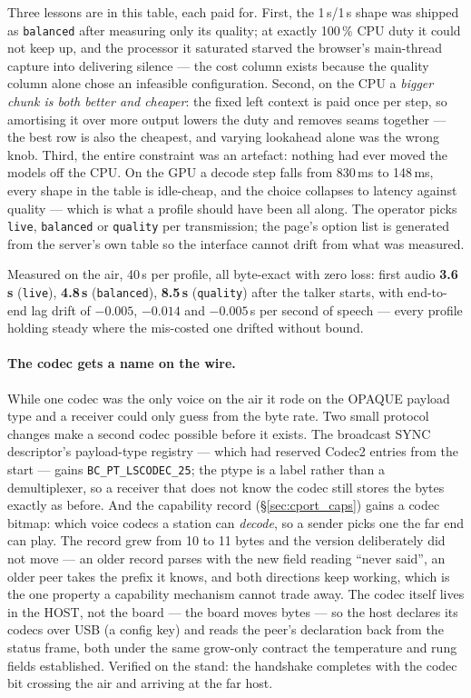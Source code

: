 Three lessons are in this table, each paid for.  First, the 1\,s/1\,s
shape was shipped as \texttt{balanced} after measuring only its
quality; at exactly 100\,\% CPU duty it could not keep up, and the
processor it saturated starved the browser's main-thread capture into
delivering silence --- the cost column exists because the quality
column alone chose an infeasible configuration.  Second, on the CPU a
\emph{bigger chunk is both better and cheaper}: the fixed left context
is paid once per step, so amortising it over more output lowers the
duty and removes seams together --- the best row is also the cheapest,
and varying lookahead alone was the wrong knob.  Third, the entire
constraint was an artefact: nothing had ever moved the models off the
CPU.  On the GPU a decode step falls from 830\,ms to 148\,ms, every
shape in the table is idle-cheap, and the choice collapses to latency
against quality --- which is what a profile should have been all
along.  The operator picks \texttt{live}, \texttt{balanced} or
\texttt{quality} per transmission; the page's option list is generated
from the server's own table so the interface cannot drift from what
was measured.

Measured on the air, 40\,s per profile, all byte-exact with zero loss:
first audio \textbf{3.6\,s} (\texttt{live}), \textbf{4.8\,s}
(\texttt{balanced}), \textbf{8.5\,s} (\texttt{quality}) after the
talker starts, with end-to-end lag drift of $-0.005$, $-0.014$ and
$-0.005$\,s per second of speech --- every profile holding steady where
the mis-costed one drifted without bound.

\paragraph{The codec gets a name on the wire.}
While one codec was the only voice on the air it rode on the OPAQUE
payload type and a receiver could only guess from the byte rate.  Two
small protocol changes make a second codec possible before it exists.
The broadcast SYNC descriptor's payload-type registry --- which had
reserved Codec2 entries from the start --- gains
\texttt{BC\_PT\_LSCODEC\_25}; the ptype is a label rather than a
demultiplexer, so a receiver that does not know the codec still stores
the bytes exactly as before.  And the capability record
(\S\ref{sec:cport_caps}) gains a codec bitmap: which voice codecs a
station can \emph{decode}, so a sender picks one the far end can play.
The record grew from 10 to 11 bytes and the version deliberately did
not move --- an older record parses with the new field reading
``never said'', an older peer takes the prefix it knows, and both
directions keep working, which is the one property a capability
mechanism cannot trade away.  The codec itself lives in the HOST, not
the board --- the board moves bytes --- so the host declares its
codecs over USB (a config key) and reads the peer's declaration back
from the status frame, both under the same grow-only contract the
temperature and rung fields established.  Verified on the stand: the
handshake completes with the codec bit crossing the air and arriving
at the far host.

